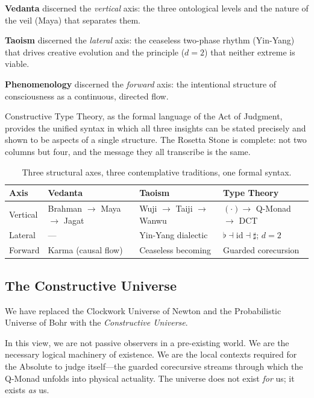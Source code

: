 \documentclass[12pt,a4paper]{article}
\newcommand{\flatmod}{\flat}
\newcommand{\sharpmod}{\sharp}
\begin{document}
\textbf{Vedanta} discerned the \emph{vertical} axis: the three ontological levels and the nature of the veil (Maya) that separates them.

\textbf{Taoism} discerned the \emph{lateral} axis: the ceaseless two-phase rhythm (Yin-Yang) that drives creative evolution and the principle ($d = 2$) that neither extreme is viable.

\textbf{Phenomenology} discerned the \emph{forward} axis: the intentional structure of consciousness as a continuous, directed flow.

Constructive Type Theory, as the formal language of the Act of Judgment, provides the unified syntax in which all three insights can be stated precisely and shown to be aspects of a single structure. The Rosetta Stone is complete: not two columns but four, and the message they all transcribe is the same.

\begin{table}[h]
\centering
\renewcommand{\arraystretch}{1.3}
\begin{tabular}{@{}lp{2.8cm}p{2.8cm}p{2.8cm}@{}}
\toprule
\textbf{Axis} & \textbf{Vedanta} & \textbf{Taoism} & \textbf{Type Theory} \\
\midrule
Vertical & Brahman $\to$ Maya $\to$ Jagat & Wuji $\to$ Taiji $\to$ Wanwu & $(\cdot) \to$ Q-Monad $\to$ DCT \\
Lateral & --- & Yin-Yang dialectic & $\flatmod \dashv \mathrm{id} \dashv \sharpmod$; $d = 2$ \\
Forward & Karma (causal flow) & Ceaseless becoming & Guarded corecursion \\
\bottomrule
\end{tabular}
\caption{Three structural axes, three contemplative traditions, one formal syntax.}
\label{tab:axes}
\end{table}


\subsection{The Constructive Universe}
\label{sec:constructive}

We have replaced the Clockwork Universe of Newton and the Probabilistic Universe of Bohr with the \emph{Constructive Universe}.

In this view, we are not passive observers in a pre-existing world. We are the necessary logical machinery of existence. We are the local contexts required for the Absolute to judge itself---the guarded corecursive streams through which the Q-Monad unfolds into physical actuality. The universe does not exist \emph{for} us; it exists \emph{as} us.
\end{document}
